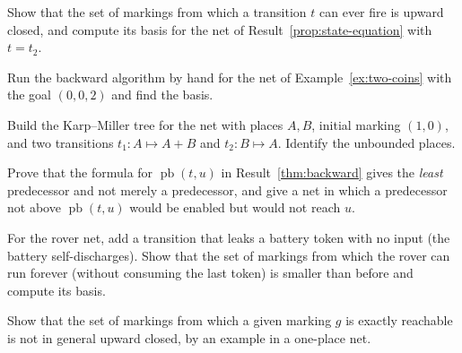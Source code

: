 \begin{exercise}
Show that the set of markings from which a transition $t$ can ever fire is upward closed, and compute its basis for the net of Result~\ref{prop:state-equation} with $t=t_2$.
\end{exercise}

\begin{exercise}
Run the backward algorithm by hand for the net of Example~\ref{ex:two-coins} with the goal $(0,0,2)$ and find the basis.
\end{exercise}

\begin{exercise}
Build the Karp--Miller tree for the net with places $A,B$, initial marking $(1,0)$, and two transitions $t_1:A\mapsto A+B$ and $t_2:B\mapsto A$. Identify the unbounded places.\label{ex2:km}
\end{exercise}

\begin{exercise}
Prove that the formula for $\operatorname{pb}(t,u)$ in Result~\ref{thm:backward} gives the \emph{least} predecessor and not merely a predecessor, and give a net in which a predecessor not above $\operatorname{pb}(t,u)$ would be enabled but would not reach $u$.
\end{exercise}

\begin{exercise}
For the rover net, add a transition that leaks a battery token with no input (the battery self-discharges). Show that the set of markings from which the rover can run forever (without consuming the last token) is smaller than before and compute its basis.
\end{exercise}

\begin{exercise}
Show that the set of markings from which a given marking $g$ is exactly reachable is not in general upward closed, by an example in a one-place net.\label{ex2:one-place}
\end{exercise}

